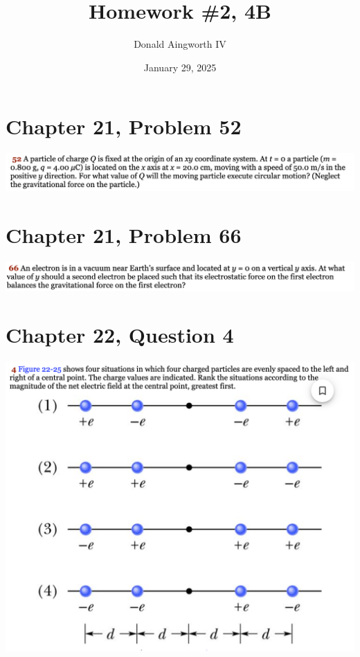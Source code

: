 \documentclass[12pt]{article}
\title{Homework \#2, 4B}
\author{Donald Aingworth IV}
\date{January 29, 2025}
\begin{document}

\maketitle

\pagebreak
\section*{Chapter 21, Problem 52}
\includegraphics[width=\textwidth]{picture_1.png}


\pagebreak
\section*{Chapter 21, Problem 66}
\includegraphics[width=\textwidth]{picture_2.png}


\pagebreak
\section*{Chapter 22, Question 4}
\includegraphics[width=\textwidth]{picture_3.png}
\end{document}
